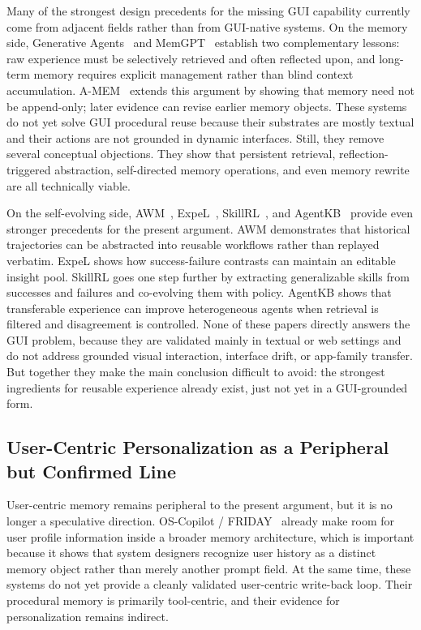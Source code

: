 \documentclass{article}
\begin{document}
Many of the strongest design precedents for the missing GUI capability
currently come from adjacent fields rather than from GUI-native systems.
On the memory side, Generative
Agents~\parencite{park2023generativeagents} and
MemGPT~\parencite{packer2023memgpt} establish two complementary
lessons: raw experience must be selectively retrieved and often
reflected upon, and long-term memory requires explicit management
rather than blind context accumulation.
A-MEM~\parencite{xu2025amem} extends this argument by showing that
memory need not be append-only; later evidence can revise earlier
memory objects. These systems do not yet solve GUI procedural reuse
because their substrates are mostly textual and their actions are not
grounded in dynamic interfaces. Still, they remove several conceptual
objections. They show that persistent retrieval,
reflection-triggered abstraction, self-directed memory operations, and
even memory rewrite are all technically viable.

On the self-evolving side, AWM~\parencite{wang2024awm},
ExpeL~\parencite{zhao2024expel},
SkillRL~\parencite{xia2026skillrl}, and
AgentKB~\parencite{tang2025agentkb} provide even stronger precedents
for the present argument. AWM demonstrates that historical trajectories
can be abstracted into reusable workflows rather than replayed
verbatim. ExpeL shows how success-failure contrasts can maintain an
editable insight pool. SkillRL
goes one step further by extracting generalizable skills from successes
and failures and co-evolving them with policy. AgentKB shows that
transferable experience can improve heterogeneous agents when retrieval
is filtered and disagreement is controlled. None of these papers
directly answers the GUI problem, because they are validated mainly in
textual or web settings and do not address grounded visual interaction,
interface drift, or app-family transfer. But together they make the main
conclusion difficult to avoid: the strongest ingredients for reusable
experience already exist, just not yet in a GUI-grounded form.

\subsection{User-Centric Personalization as a Peripheral but
Confirmed
Line}\label{55-user-centric-personalization-as-a-peripheral-but-confirmed-line}

User-centric memory remains peripheral to the present argument, but it
is no longer a speculative direction. OS-Copilot /
FRIDAY~\parencite{wu2024oscopilot} already make room for user profile
information inside a broader memory architecture, which is important
because it shows that system designers recognize user history as a
distinct memory object rather than merely another prompt field. At the
same time, these systems do not yet provide a cleanly validated
user-centric write-back loop. Their procedural memory is primarily
tool-centric, and their evidence for personalization remains indirect.
\end{document}
